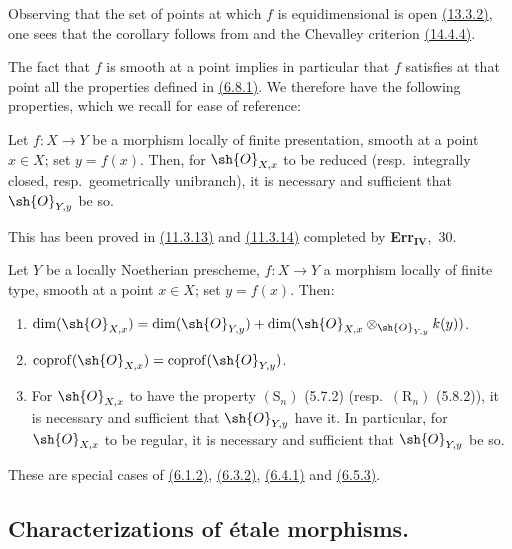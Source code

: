 Observing that the set of points at which $f$ is equidimensional is open {\hyperlink{ega4.c04.def.13-3-2}{(13.3.2)}}, one sees that the corollary follows from  and the Chevalley criterion {\hyperlink{ega4.c04.cor.14-4-4}{(14.4.4)}}.

The fact that $f$ is smooth at a point implies in particular that $f$ satisfies
at that point all the properties defined in {\hyperlink{ega4.c04.def.6-8-1}{(6.8.1)}}. We therefore have the following properties, which we recall for ease of reference:

\begin{proposition}[17.5.7]
\label{IV.17.5.7}
Let $f:X\to Y$ be a morphism locally of finite presentation, smooth at a point $x\in X$; set $y=f(x)$.
Then, for $\sh{O}_{X,x}$ to be reduced (resp.\ integrally closed, resp.\ geometrically unibranch), it is necessary and sufficient that $\sh{O}_{Y,y}$ be so.
\end{proposition}

This has been proved in {\hyperlink{ega4.c04.prop.11-3-13}{(11.3.13)}} and {\hyperlink{ega4.c04.cor.11-3-14}{(11.3.14)}} completed by \textbf{Err}$_\textbf{IV}$,~30.

\begin{proposition}[17.5.8]
\label{IV.17.5.8}
Let $Y$ be a locally Noetherian prescheme, $f:X\to Y$ a morphism locally of finite type, smooth at a point $x\in X$; set $y=f(x)$.
Then:
\begin{enumerate}[label=(\roman*)]
  \item $\dim(\sh{O}_{X,x})=\dim(\sh{O}_{Y,y})+\dim(\sh{O}_{X,x}\otimes_{\sh{O}_{Y,y}}k(y))$.
  \item $\operatorname{coprof}(\sh{O}_{X,x})=\operatorname{coprof}(\sh{O}_{Y,y})$.
  \item For $\sh{O}_{X,x}$ to have the property $(\mathrm{S}_n)$ (5.7.2) (resp.\ $(\mathrm{R}_n)$ (5.8.2)), it is necessary and sufficient that $\sh{O}_{Y,y}$ have it.
  In particular, for $\sh{O}_{X,x}$ to be regular, it is necessary and sufficient that $\sh{O}_{Y,y}$ be so.
\end{enumerate}
\end{proposition}

These are special cases of {\hyperlink{ega4.c04.cor.6-1-2}{(6.1.2)}}, {\hyperlink{ega4.c04.cor.6-3-2}{(6.3.2)}}, {\hyperlink{ega4.c04.prop.6-4-1}{(6.4.1)}} and {\hyperlink{ega4.c04.prop.6-5-3}{(6.5.3)}}.


\subsection{Characterizations of \'etale morphisms.}
\label{subsection:IV.17.6}

